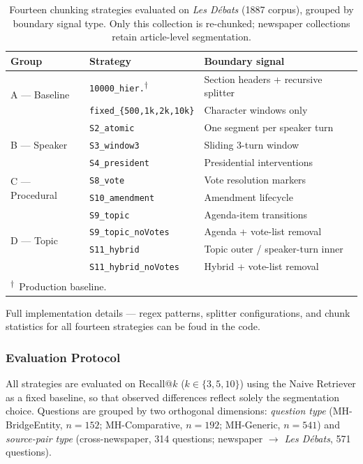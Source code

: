 \begin{table}[htbp]
\centering
\tiny
\begin{tabular}{l l p{3.1cm}}
\toprule
\textbf{Group} & \textbf{Strategy} & \textbf{Boundary signal} \\
\midrule
\multirow{2}{*}{A — Baseline}
  & \texttt{10000\_hier.}\textsuperscript{†} & Section headers + recursive splitter \\
  & \texttt{fixed\_\{500,1k,2k,10k\}} & Character windows only \\
\midrule
\multirow{3}{*}{B — Speaker}
  & \texttt{S2\_atomic} & One segment per speaker turn \\
  & \texttt{S3\_window3} & Sliding 3-turn window \\
  & \texttt{S4\_president} & Presidential interventions \\
\midrule
\multirow{2}{*}{C — Procedural}
  & \texttt{S8\_vote} & Vote resolution markers \\
  & \texttt{S10\_amendment} & Amendment lifecycle \\
\midrule
\multirow{4}{*}{D — Topic}
  & \texttt{S9\_topic} & Agenda-item transitions \\
  & \texttt{S9\_topic\_noVotes} & Agenda + vote-list removal \\
  & \texttt{S11\_hybrid} & Topic outer / speaker-turn inner \\
  & \texttt{S11\_hybrid\_noVotes} & Hybrid + vote-list removal \\
\bottomrule
\multicolumn{3}{l}{\footnotesize\textsuperscript{†}~Production baseline.}
\end{tabular}
\caption{Fourteen chunking strategies evaluated on \textit{Les Débats}
(1887 corpus), grouped by boundary signal type.
Only this collection is re-chunked; newspaper collections retain
article-level segmentation.}
\label{tab:chunking-families}
\end{table}

Full implementation details — regex patterns, splitter configurations, and chunk
statistics for all fourteen strategies can be foud in the code.

\subsubsection{Evaluation Protocol}
\label{sec:indexing-eval-protocol}

All strategies are evaluated on Recall@$k$ ($k \in \{3,5,10\}$) using the
Naive Retriever as a fixed baseline, so that observed differences reflect
solely the segmentation choice.
Questions are grouped by two orthogonal dimensions: \emph{question type}
(MH-BridgeEntity, $n{=}152$; MH-Comparative, $n{=}192$; MH-Generic, $n{=}541$)
and \emph{source-pair type} (cross-newspaper, 314 questions;
newspaper $\rightarrow$ \textit{Les Débats}, 571 questions).

